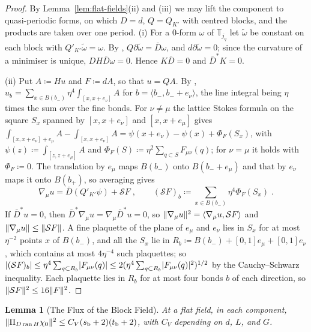 \documentclass[11pt]{preprint}
\DeclarePairedDelimiter{\abs}{\lvert}{\rvert}
\DeclarePairedDelimiter{\norm}{\lVert}{\rVert}
\numberwithin{equation}{section}
\newtheorem{lemma}[theorem]{Lemma}
\theoremstyle{definition}
\theoremstyle{remark}
\theoremstyle{plain}
\begin{document}
\begin{proof}
By Lemma~\ref{lem:flat-fields}(ii) and (iii) we may lift the component to quasi-periodic forms, on which $D = d$, $Q = Q_{K'}$ with centred blocks, and the products are taken over one period. (i) For a $0$-form $\omega$ of $\mathbb T_{j_q}$ let $\tilde\omega$ be constant on each block with $Q'_{K'}\tilde\omega = \omega$. By \cite[(1.20), p.~20]{BalabanPRT1}, $Q\partial\tilde\omega = \bar D\omega$, and $d\partial\tilde\omega = 0$; since the curvature of a minimiser is unique, $DH\bar D\omega = 0$. Hence $K\bar D = 0$ and $\bar D^*K = 0$.

(ii) Put $A \coloneqq Hu$ and $F \coloneqq dA$, so that $u = QA$. By \cite[(1.18)]{BalabanPRT1}, $u_b = \sum_{x \in B(b_-)}\eta^4\int_{[x,x+e_\nu]}A$ for $b = \langle b_-, b_- + e_\nu\rangle$, the line integral being $\eta$ times the sum over the fine bonds. For $\nu \neq \mu$ the lattice Stokes formula on the square $S_x$ spanned by $[x, x + e_\nu]$ and $[x, x + e_\mu]$ gives $\int_{[x,x+e_\nu]+e_\mu}A - \int_{[x,x+e_\nu]}A = \psi(x + e_\nu) - \psi(x) + \Phi_F(S_x)$, with $\psi(z) \coloneqq \int_{[z,z+e_\mu]}A$ and $\Phi_F(S) \coloneqq \eta^2\sum_{q \subset S}F_{\mu\nu}(q)$; for $\nu = \mu$ it holds with $\Phi_F \coloneqq 0$. The translation by $e_\mu$ maps $B(b_-)$ onto $B(b_- + e_\mu)$ and that by $e_\nu$ maps it onto $B(b_+)$, so averaging gives
\begin{equation}\label{eq:difference-stokes}
    \nabla_\mu u = \bar D(Q'_{K'}\psi) + \mathcal SF\;,
    \qquad
    (\mathcal SF)_b \coloneqq \sum_{x \in B(b_-)}\eta^4\Phi_F(S_x)\;.
\end{equation}
If $\bar D^*u = 0$, then $\bar D^*\nabla_\mu u = \nabla_\mu\bar D^*u = 0$, so $\norm{\nabla_\mu u}^2 = \langle\nabla_\mu u, \mathcal SF\rangle$ and $\norm{\nabla_\mu u} \leq \norm{\mathcal SF}$. A fine plaquette of the plane of $e_\mu$ and $e_\nu$ lies in $S_x$ for at most $\eta^{-2}$ points $x$ of $B(b_-)$, and all the $S_x$ lie in $R_b \coloneqq B(b_-) + [0, 1]e_\mu + [0, 1]e_\nu$, which contains at most $4\eta^{-4}$ such plaquettes; so $\abs{(\mathcal SF)_b} \leq \eta^4\sum_{q \subset R_b}\abs{F_{\mu\nu}(q)} \leq 2(\eta^4\sum_{q \subset R_b}\abs{F_{\mu\nu}(q)}^2)^{1/2}$ by the Cauchy--Schwarz inequality. Each plaquette lies in $R_b$ for at most four bonds $b$ of each direction, so $\norm{\mathcal SF}^2 \leq 16\norm F^2$.
\end{proof}

\begin{lemma}[The Flux of the Block Field]\label{lem:flux-norm}
At a flat field, in each component, $\norm{\Pi_{D\operatorname{ran}H}\chi_0}^2 \leq C_V(s_{\mathrm b} + 2)(t_{\mathrm b} + 2)$, with $C_V$ depending on $d$, $L$, and $G$.
\end{lemma}
\end{document}
